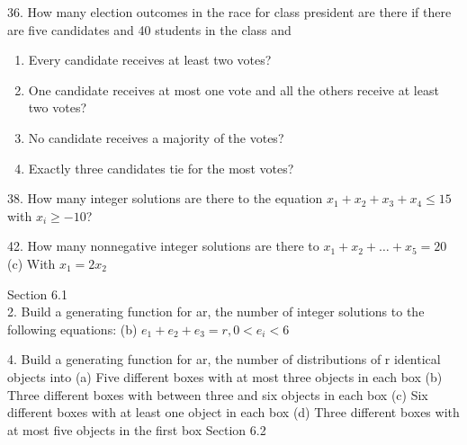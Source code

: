 \documentclass[12pt]{article}
\begin{document}
36. How many election outcomes in the race for class president are there 
if there are five candidates and 40 students in the class and
\begin{enumerate}[label=(\alph*)]
    \item Every candidate receives at least two votes?
    \begin{solution}
        
    \end{solution}
    \item One candidate receives at most one vote and all the others receive at least
    two votes?
    \item No candidate receives a majority of the votes?
    \item Exactly three candidates tie for the most votes?
\end{enumerate}
38. How many integer solutions are there to the equation $x_1 + x_2 + x_3 + x_4 \le 15$
with $x_i \ge -10$?
\begin{solution}
    
\end{solution}
42. How many nonnegative integer solutions are there to 
$x_1 + x_2 + \dots + x_5 = 20$\\
(c) With $x_1=2x_2$
\begin{solution}
    
\end{solution}
Section 6.1\\
2. Build a generating function for ar, the number of integer solutions 
to the following equations:
(b) $e_1 + e_2 + e_3 = r, 0 < e_i < 6$
\begin{solution}
    
\end{solution}
4. Build a generating function for ar, the number of distributions of r identical
objects into
(a) Five different boxes with at most three objects in each box
(b) Three different boxes with between three and six objects in each box
(c) Six different boxes with at least one object in each box
(d) Three different boxes with at most five objects in the first box
Section 6.2
\end{document}
